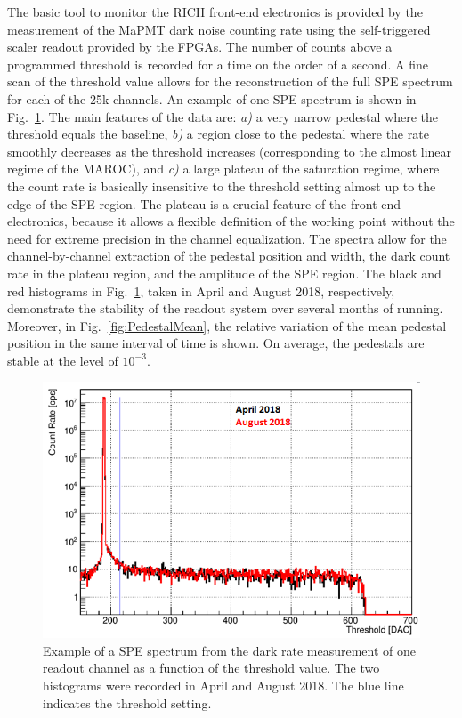 \documentclass[5p,times,twocolumn]{elsarticle}
\begin{document}
The basic tool to monitor the RICH front-end electronics is provided by the measurement of the MaPMT dark noise
counting rate using the self-triggered scaler readout provided by the FPGAs. The number of counts above a programmed
threshold is recorded for a time on the order of a second. A fine scan of the threshold value allows for the
reconstruction of the full SPE spectrum for each of the 25k channels. An example of one SPE spectrum is shown in
Fig.~\ref{fig:SPEdark}. The main features of the data are: {\it{a)}} a very narrow pedestal where the threshold equals
the baseline,  {\it{b)}} a region close to the pedestal where the rate smoothly decreases as the threshold increases
(corresponding to the almost linear regime of the MAROC), and  {\it{c)}} a large plateau of the saturation regime, where
the count rate is basically insensitive to the threshold setting almost up to the edge of the SPE region. The plateau is a
crucial feature of the front-end electronics, because it allows a flexible definition of the working point without the need
for extreme precision in the channel equalization. The spectra allow for the channel-by-channel extraction of the 
pedestal position and width, the dark count rate in the plateau region, and the amplitude of the SPE region. The black
and red histograms in Fig.~\ref{fig:SPEdark}, taken in April and August 2018, respectively, demonstrate the stability
of the readout system over several months of running. Moreover, in Fig.~\ref{fig:PedestalMean}, the relative variation
of the mean pedestal position in the same interval of time is shown. On average, the pedestals are stable at the level of
$10^{-3}$.

\begin{figure}[t]
\begin{center}
\includegraphics[width=1.0\columnwidth]{SPEdark.png}
\end{center}
\caption{Example of a SPE spectrum from the dark rate measurement of one readout channel as a function of the
  threshold value. The two histograms were recorded in April and August 2018. The blue line indicates the threshold
  setting.}
\label{fig:SPEdark}
\end{figure}
\end{document}

